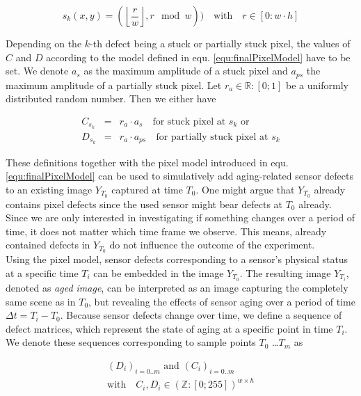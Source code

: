 \documentclass[10pt,twocolumn,letterpaper]{article}
\providecommand{\myfloor}[1]{\left \lfloor #1 \right \rfloor }
\begin{document}
\begin{equation}
 s_k(x,y) = (\myfloor{\frac{r}{w}}, r \mod{w})) \quad \text{with} \quad r \in [0:w \cdot h]
 \label{equ:defectLocation}
\end{equation}

Depending on the $k$-th defect being a stuck or partially stuck pixel, the values of $C$ and $D$ according to the model defined in equ. \ref{equ:finalPixelModel} have to be set. We denote $a_s$ as the maximum amplitude of a stuck pixel and $a_{ps}$ the maximum amplitude of a partially stuck pixel. Let $r_a \in \mathbb{R}:[0;1]$ be a uniformly distributed random number. Then we either have

\begin{eqnarray}
   C_{s_k}  & = & r_a \cdot a_s \quad \text{for stuck pixel at } s_k \text{ or} \label{equ:stucks} \\
   D_{s_k} & = &  r_a \cdot a_{ps} \quad \text{for partially stuck pixel at } s_k \label{equ:partiallyStuck}
\end{eqnarray}

These definitions together with the pixel model introduced in equ. \ref{equ:finalPixelModel} can be used to simulatively add aging-related sensor defects to an existing image $Y_{T_0}$ captured at time ${T_0}$. One might argue that $Y_{T_0}$ already contains pixel defects since the used sensor might bear defects at $T_0$ already. Since we are only interested in investigating if something changes over a period of time, it does not matter which time frame we observe. This means, already contained defects in $Y_{T_0}$ do not influence the outcome of the experiment. \\
Using the pixel model, sensor defects corresponding to a sensor's physical status at a specific time $T_i$ can be embedded in the image $Y_{T_0}$. The resulting image $Y_{T_i}$, denoted as \emph{aged image}, can be interpreted as an image capturing the completely same scene as in $T_0$, but revealing the effects of sensor aging over a period of time $\Delta t = {T_i} - {T_0}$. Because sensor defects change over time, we define a sequence of defect matrices, which represent the state of aging at a specific point in time $T_i$. We denote these sequences corresponding to sample points $T_0$ \dots $T_m$ as

\begin{equation}
\begin{aligned}
(D_i)_{i=0..m} \text{ and } (C_i)_{i=0..m} \\ 
\text{with} \quad C_i, D_i \in {(\mathbb{Z}:[0;255])}^{w \times h}
\end{aligned}
\end{equation}
\end{document}
